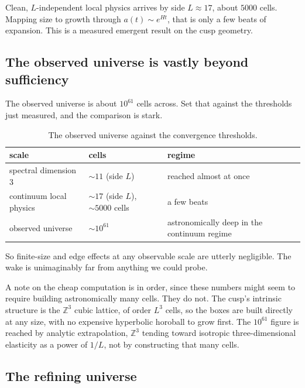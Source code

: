 \begin{result}
Clean, $L$-independent local physics arrives by side $L \approx 17$, about $5000$ cells. Mapping size to growth through $a(t) \sim e^{H t}$, that is only a few beats of expansion. This is a measured emergent result on the cusp geometry.
\end{result}

\subsection{The observed universe is vastly beyond sufficiency}

The observed universe is about $10^{61}$ cells across. Set that against the thresholds just measured, and the comparison is stark.

\begin{table}[ht]
\centering
\begin{tabular}{@{}lll@{}}
\toprule
scale & cells & regime \\
\midrule
spectral dimension $3$ & $\sim 11$ (side $L$) & reached almost at once \\
continuum local physics & $\sim 17$ (side $L$), $\sim 5000$ cells & a few beats \\
observed universe & $\sim 10^{61}$ & astronomically deep in the continuum regime \\
\bottomrule
\end{tabular}
\caption{The observed universe against the convergence thresholds.}
\label{tab:universe-scale}
\end{table}

So finite-size and edge effects at any observable scale are utterly negligible. The wake is unimaginably far from anything we could probe.

A note on the cheap computation is in order, since these numbers might seem to require building astronomically many cells. They do not. The cusp's intrinsic structure is the $\mathbb{Z}^3$ cubic lattice, of order $L^3$ cells, so the boxes are built directly at any size, with no expensive hyperbolic horoball to grow first. The $10^{61}$ figure is reached by analytic extrapolation, $\mathbb{Z}^3$ tending toward isotropic three-dimensional elasticity as a power of $1/L$, not by constructing that many cells.

\subsection{The refining universe}

